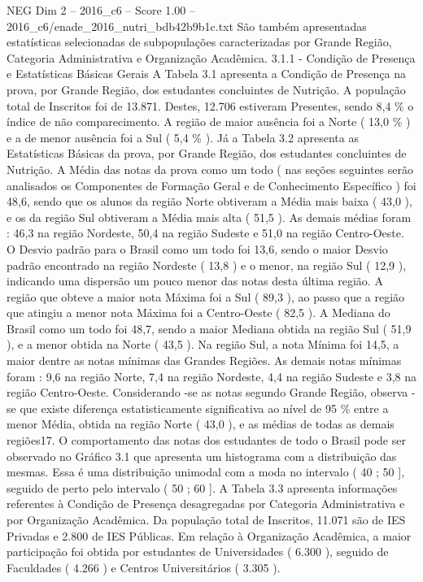 \begin{textsample}{NEG Dim 2 – 2016\_c6 – Score 1.00 – 2016\_c6/enade\_2016\_nutri\_bdb42b9b1c.txt}
São também apresentadas estatísticas selecionadas de subpopulações caracterizadas por Grande Região, Categoria Administrativa e Organização Acadêmica. 3.1.1 - Condição de Presença e Estatísticas Básicas Gerais A Tabela 3.1 apresenta a Condição de Presença na prova, por Grande Região, dos estudantes concluintes de Nutrição.
A população total de Inscritos foi de 13.871.
Destes, 12.706 estiveram Presentes, sendo 8,4 \% o índice de não comparecimento.
A região de maior ausência foi a Norte ( 13,0 \% ) e a de menor ausência foi a Sul ( 5,4 \% ).
Já a Tabela 3.2 apresenta as Estatísticas Básicas da prova, por Grande Região, dos estudantes concluintes de Nutrição.
A Média das notas da prova como um todo ( nas seções seguintes serão analisados os Componentes de Formação Geral e de Conhecimento Específico ) foi 48,6, sendo que os alunos da região Norte obtiveram a Média mais baixa ( 43,0 ), e os da região Sul obtiveram a Média mais alta ( 51,5 ).
As demais médias foram : 46,3 na região Nordeste, 50,4 na região Sudeste e 51,0 na região Centro-Oeste.
O Desvio padrão para o Brasil como um todo foi 13,6, sendo o maior Desvio padrão encontrado na região Nordeste ( 13,8 ) e o menor, na região Sul ( 12,9 ), indicando uma dispersão um pouco menor das notas desta última região.
A região que obteve a maior nota Máxima foi a Sul ( 89,3 ), ao passo que a região que atingiu a menor nota Máxima foi a Centro-Oeste ( 82,5 ).
A Mediana do Brasil como um todo foi 48,7, sendo a maior Mediana obtida na região Sul ( 51,9 ), e a menor obtida na Norte ( 43,5 ).
Na região Sul, a nota Mínima foi 14,5, a maior dentre as notas mínimas das Grandes Regiões.
As demais notas mínimas foram : 9,6 na região Norte, 7,4 na região Nordeste, 4,4 na região Sudeste e 3,8 na região Centro-Oeste.
Considerando -se as notas segundo Grande Região, observa -se que existe diferença estatisticamente significativa ao nível de 95 \% entre a menor Média, obtida na região Norte ( 43,0 ), e as médias de todas as demais regiões17.
O comportamento das notas dos estudantes de todo o Brasil pode ser observado no Gráfico 3.1 que apresenta um histograma com a distribuição das mesmas.
Essa é uma distribuição unimodal com a moda no intervalo ( 40 ; 50 ], seguido de perto pelo intervalo ( 50 ; 60 ].
A Tabela 3.3 apresenta informações referentes à Condição de Presença desagregadas por Categoria Administrativa e por Organização Acadêmica.
Da população total de Inscritos, 11.071 são de IES Privadas e 2.800 de IES Públicas.
Em relação à Organização Acadêmica, a maior participação foi obtida por estudantes de Universidades ( 6.300 ), seguido de Faculdades ( 4.266 ) e Centros Universitários ( 3.305 ).

\end{textsample}
